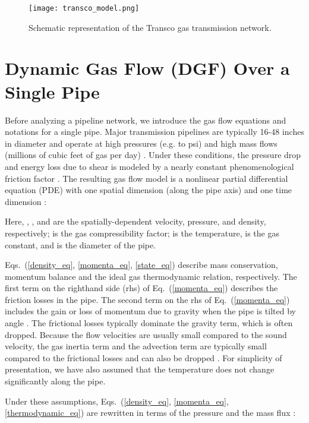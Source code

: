 \documentclass[10pt, conference, compsocconf]{IEEEtran}
\begin{document}
 \begin{figure}
\centering
\texttt{[image: transco\_model.png]}
\caption{Schematic representation of the Transco gas transmission network.}
\label{fig:Transco}
\end{figure}

\section{Dynamic Gas Flow (DGF) Over a Single Pipe}
\label{sec:TI}


Before analyzing a pipeline network, we introduce the gas flow equations and notations for a single pipe. Major transmission pipelines are typically 16-48 inches in diameter and operate at high pressures (e.g.  to  psi) and high mass flows (millions of cubic feet of gas per day) \cite{Ref_Crane1982,Ref_Mokhatab2006}. Under these conditions, the pressure drop and energy loss due to shear is modeled by a nearly constant phenomenological friction factor .  The resulting gas flow model is a nonlinear partial differential equation (PDE) with one spatial dimension  (along the pipe axis) and one time dimension \cite{osiadacz1987simulation,87TT,05Sar}:

Here, , , and  are the spatially-dependent velocity, pressure, and density, respectively;  is the gas compressibility factor;  is the temperature,  is the gas constant, and  is the diameter of the pipe.

Eqs.~(\ref{density_eq}, \ref{momenta_eq}, \ref{state_eq}) describe mass conservation, momentum balance and the ideal gas thermodynamic relation, respectively. The first term on the righthand side (rhs) of Eq.~(\ref{momenta_eq}) describes the friction losses in the pipe. The second term on the rhs of Eq.~(\ref{momenta_eq}) includes the gain or loss of momentum due to gravity  when the pipe is tilted by angle .  The frictional losses typically dominate the gravity term, which is often dropped.  Because the flow velocities are usually small compared to the sound velocity, the gas inertia term  and the advection term  are typically small compared to the frictional losses and can also be dropped \cite{osiadacz1987simulation,87TT,05Sar}. For simplicity of presentation, we have also assumed that the temperature does not change significantly along the pipe.

Under these assumptions, Eqs.~(\ref{density_eq}, \ref{momenta_eq}, \ref{thermodynamic_eq}) are rewritten in terms of the pressure  and the mass flux :
\end{document}
